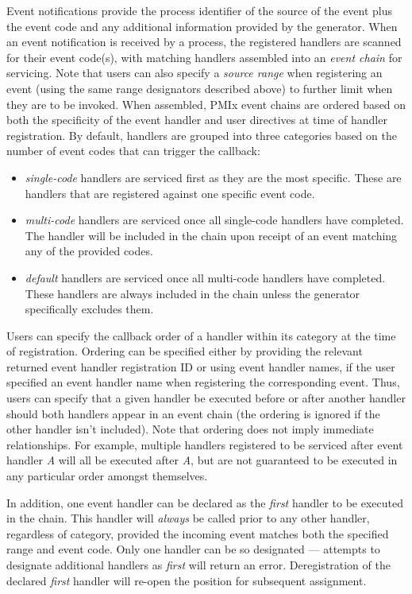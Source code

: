 Event notifications provide the process identifier of the source of the event plus the event code and any additional information provided by the generator. When an event notification is received by a process, the registered handlers are scanned for their event code(s), with matching handlers assembled into an \textit{event chain} for servicing. Note that users can also specify a \textit{source range} when registering an event (using the same range designators described above) to further limit when they are to be invoked. When assembled, PMIx event chains are ordered based on both the specificity of the event handler and user directives at time of handler registration. By default, handlers are grouped into three categories based on the number of event codes that can trigger the callback:
\begin{itemize}
%
\item \textit{single-code} handlers are serviced first as they are the most specific. These are handlers that are registered against one specific event code.
%
\item \textit{multi-code} handlers are serviced once all single-code handlers have completed. The handler will be included in the chain upon receipt of an event matching any of the provided codes.
%
\item \textit{default} handlers are serviced once all multi-code handlers have completed. These handlers are always included in the chain unless the generator specifically excludes them.
%
\end{itemize}

Users can specify the callback order of a handler within its category at the time of registration. Ordering can be specified either by providing the relevant returned event handler registration ID or using event handler names, if the user specified an event handler name when registering the corresponding event. Thus, users can specify that a given handler be executed before or after another handler should both handlers appear in an event chain (the ordering is ignored if the other handler isn't included). Note that ordering does not imply immediate relationships. For example, multiple handlers registered to be serviced after event handler \textit{A} will all be executed after \textit{A}, but are not guaranteed to be executed in any particular order amongst themselves.

In addition, one event handler can be declared as the \textit{first} handler to be executed in the chain. This handler will \textit{always} be called prior to any other handler, regardless of category, provided the incoming event matches both the specified range and event code. Only one handler can be so designated --- attempts to designate additional handlers as \textit{first} will return an error. Deregistration of the declared \textit{first} handler will re-open the position for subsequent assignment.

